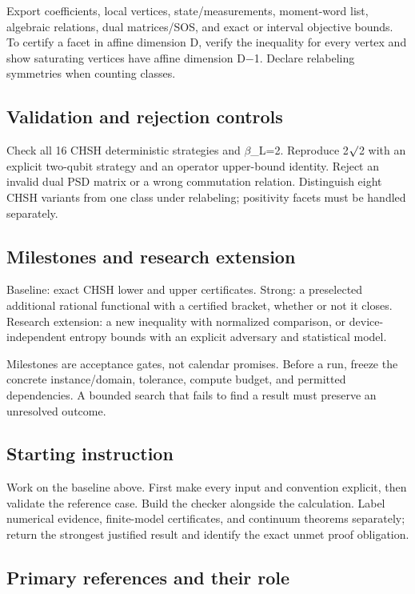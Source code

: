 \documentclass[
  11pt,
]{article}
\begin{document}
Export coefficients, local vertices, state/measurements, moment-word
list, algebraic relations, dual matrices/SOS, and exact or interval
objective bounds. To certify a facet in affine dimension D, verify the
inequality for every vertex and show saturating vertices have affine
dimension D\ensuremath{-}1. Declare relabeling symmetries when counting
classes.

\subsection{Validation and rejection controls}

Check all 16 CHSH deterministic strategies and \ensuremath{\beta}\_L=2.
Reproduce 2\ensuremath{\surd}2 with an explicit two-qubit strategy and
an operator upper-bound identity. Reject an invalid dual PSD matrix or a
wrong commutation relation. Distinguish eight CHSH variants from one
class under relabeling; positivity facets must be handled separately.

\subsection{Milestones and research extension}

Baseline: exact CHSH lower and upper certificates. Strong: a preselected
additional rational functional with a certified bracket, whether or not
it closes. Research extension: a new inequality with normalized
comparison, or device-independent entropy bounds with an explicit
adversary and statistical model.

Milestones are acceptance gates, not calendar promises. Before a run,
freeze the concrete instance/domain, tolerance, compute budget, and
permitted dependencies. A bounded search that fails to find a result
must preserve an unresolved outcome.

\subsection{Starting instruction}

Work on the baseline above. First make every input and convention
explicit, then validate the reference case. Build the checker alongside
the calculation. Label numerical evidence, finite-model certificates,
and continuum theorems separately; return the strongest justified result
and identify the exact unmet proof obligation.

\subsection{Primary references and their role}
\end{document}
